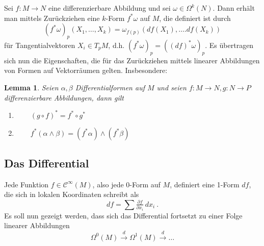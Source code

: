 \documentclass[12pt,a4paper]{article}
\newtheorem{Lemma}{Lemma}[section]
\begin{document}
Sei $f: M \rightarrow N$ eine differenzierbare  Abbildung und sei $\omega \in \Omega^k(N)$. Dann erh\"alt man
mittels Zur\"uckziehen eine $k$-Form $f^*\omega$ auf $M$, die definiert ist durch
$$
(f^*\omega)_p (X_1, \ldots , X_k)
=
\omega_{f(p)} (df (X_1), \ldots . df(X_k))
$$
f\"ur Tangentialvektoren $X_i \in T_pM$, d.h. $(f^*\omega)_p =
((df)^*\omega)_p$. Es \"ubertragen sich nun die Eigenschaften, die f\"ur das Zur\"uckziehen mittels linearer Abbildungen von Formen auf Vektorr\"aumen gelten. Insbesondere:

\begin{Lemma}
Seien $\alpha, \beta$ Differentialformen auf $M$ und seien $f:M\rightarrow N, g: N \rightarrow P$ differenzierbare
Abbildungen, dann gilt
\begin{enumerate}
\item
$ \qquad (g \circ f)^* = f^* \circ g^*$
\item
$ \qquad f^*(\alpha \wedge \beta) = (f^*\alpha) \wedge (f^*\beta) $
\end{enumerate}
\end{Lemma}


\bigskip

\subsection{Das Differential}

Jede Funktion $f \in \mathcal C^\infty(M)$, also jede 0-Form auf $M$, definiert eine 1-Form $df$,
die sich in lokalen  Koordinaten schreibt als
$$
df = \sum \tfrac{\partial f}{\partial x_i}\, dx_i \ .
$$
Es soll nun gezeigt werden, dass sich das Differential fortsetzt zu einer Folge linearer
Abbildungen
$$
\Omega^0(M)   \stackrel{d}{\rightarrow}  \Omega^1(M)    \stackrel{d}{\rightarrow} \ldots
$$


\bigskip
\end{document}
